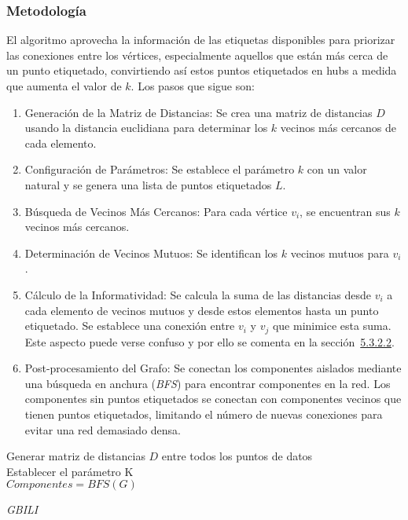 \subsubsection{Metodología}
El algoritmo aprovecha la información de las etiquetas disponibles para priorizar las conexiones entre los vértices, especialmente aquellos que están más cerca de un punto etiquetado, convirtiendo así estos puntos etiquetados en hubs a medida que aumenta el valor de $k$.
Los pasos que sigue son:
\begin{enumerate}
	\item Generación de la Matriz de Distancias: Se crea una matriz de distancias $D$ usando la distancia euclidiana para determinar los $k$ vecinos más cercanos de cada elemento.
	\item Configuración de Parámetros: Se establece el parámetro $k$ con un valor natural y se genera una lista de puntos etiquetados	$L$.
	\item Búsqueda de Vecinos Más Cercanos: Para cada vértice $v_i$, se encuentran sus $k$ vecinos más cercanos.
	\item Determinación de Vecinos Mutuos: Se identifican los $k$ vecinos mutuos para $v_i$.
	\item Cálculo de la Informatividad: Se calcula la suma de las distancias desde $v_i$ a cada elemento de vecinos mutuos y desde estos elementos hasta un punto etiquetado. Se establece una conexión entre $v_i$ y $v_j$ que minimice esta suma. Este aspecto puede verse confuso y por ello se comenta en la sección~\hyperref[sec5:gbili]{5.3.2.2}.
	\item Post-procesamiento del Grafo: Se conectan los componentes aislados mediante una búsqueda en anchura (\textit{BFS}) para encontrar componentes en la red. Los componentes sin puntos etiquetados se conectan con componentes vecinos que tienen puntos etiquetados, limitando el número de nuevas conexiones para evitar una red demasiado densa.
\end{enumerate}

\begin{algorithm}[H]
\scriptsize
	\label{alg:Gbili}
	\BlankLine
	Generar matriz de distancias $D$ entre todos los puntos de datos\\
	Establecer el parámetro K\\
	$Componentes = BFS(G)$\\
	\caption{\textit{GBILI}}
\end{algorithm}

